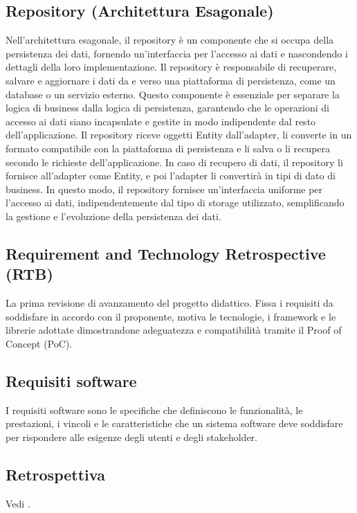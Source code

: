 \subsection*{Repository (Architettura Esagonale)}
Nell'architettura esagonale, il repository è un componente che si occupa della persistenza dei dati, fornendo un'interfaccia per l'accesso ai dati
e nascondendo i dettagli della loro implementazione. Il repository è responsabile di recuperare, salvare e aggiornare i dati da e verso una piattaforma
di persistenza, come un database o un servizio esterno. Questo componente è essenziale per separare la logica di business dalla logica di persistenza,
garantendo che le operazioni di accesso ai dati siano incapsulate e gestite in modo indipendente dal resto dell'applicazione.
Il repository riceve oggetti Entity dall'adapter, li converte in un formato compatibile con la piattaforma di persistenza e li salva o li recupera
secondo le richieste dell'applicazione. In caso di recupero di dati, il repository li fornisce all'adapter come Entity, e poi l'adapter li convertirà in
tipi di dato di business. In questo modo, il repository fornisce un'interfaccia uniforme per l'accesso ai dati, indipendentemente dal
tipo di storage utilizzato, semplificando la gestione e l'evoluzione della persistenza dei dati.

\subsection*{Requirement and Technology Retrospective (RTB)}
La prima revisione di avanzamento del progetto didattico. Fissa i requisiti da soddisfare in accordo con il proponente, motiva le tecnologie, i framework 
e le librerie adottate dimostrandone adeguatezza e compatibilità tramite il Proof of Concept (PoC).

\hypertarget{sec:requisiti_software}{}
\subsection*{Requisiti software}
I requisiti software sono le specifiche che definiscono le funzionalità, le prestazioni, i vincoli e le caratteristiche che 
un sistema software deve soddisfare per rispondere alle esigenze degli utenti e degli stakeholder.

\subsection*{Retrospettiva}
Vedi .

\newpage